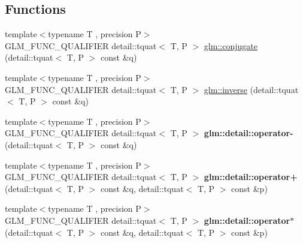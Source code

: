 \subsection*{Functions}
\begin{DoxyCompactItemize}
\item 
{\footnotesize template$<$typename T , precision P$>$ }\\G\+L\+M\+\_\+\+F\+U\+N\+C\+\_\+\+Q\+U\+A\+L\+I\+F\+I\+ER detail\+::tquat$<$ T, P $>$ \hyperlink{group__gtc__quaternion_gaf78006c47276b151777fc194cf11a688}{glm\+::conjugate} (detail\+::tquat$<$ T, P $>$ const \&q)
\item 
{\footnotesize template$<$typename T , precision P$>$ }\\G\+L\+M\+\_\+\+F\+U\+N\+C\+\_\+\+Q\+U\+A\+L\+I\+F\+I\+ER detail\+::tquat$<$ T, P $>$ \hyperlink{group__gtc__quaternion_ga6613ef61cb980a18f19ece5f421564da}{glm\+::inverse} (detail\+::tquat$<$ T, P $>$ const \&q)
\item 
{\footnotesize template$<$typename T , precision P$>$ }\\G\+L\+M\+\_\+\+F\+U\+N\+C\+\_\+\+Q\+U\+A\+L\+I\+F\+I\+ER detail\+::tquat$<$ T, P $>$ {\bfseries glm\+::detail\+::operator-\/} (detail\+::tquat$<$ T, P $>$ const \&q)\hypertarget{glm_2include_2glm_2gtc_2quaternion_8inl_aaeaeb4c634f2abcfe3c524db5e38d863}{}\label{glm_2include_2glm_2gtc_2quaternion_8inl_aaeaeb4c634f2abcfe3c524db5e38d863}

\item 
{\footnotesize template$<$typename T , precision P$>$ }\\G\+L\+M\+\_\+\+F\+U\+N\+C\+\_\+\+Q\+U\+A\+L\+I\+F\+I\+ER detail\+::tquat$<$ T, P $>$ {\bfseries glm\+::detail\+::operator+} (detail\+::tquat$<$ T, P $>$ const \&q, detail\+::tquat$<$ T, P $>$ const \&p)\hypertarget{glm_2include_2glm_2gtc_2quaternion_8inl_a80b78b61eccf89d7d4f0e5dbd7f93aec}{}\label{glm_2include_2glm_2gtc_2quaternion_8inl_a80b78b61eccf89d7d4f0e5dbd7f93aec}

\item 
{\footnotesize template$<$typename T , precision P$>$ }\\G\+L\+M\+\_\+\+F\+U\+N\+C\+\_\+\+Q\+U\+A\+L\+I\+F\+I\+ER detail\+::tquat$<$ T, P $>$ {\bfseries glm\+::detail\+::operator$\ast$} (detail\+::tquat$<$ T, P $>$ const \&q, detail\+::tquat$<$ T, P $>$ const \&p)\hypertarget{glm_2include_2glm_2gtc_2quaternion_8inl_ac01bc808c06043b6b7f321b39775a64c}{}\label{glm_2include_2glm_2gtc_2quaternion_8inl_ac01bc808c06043b6b7f321b39775a64c}


\end{DoxyCompactItemize}
